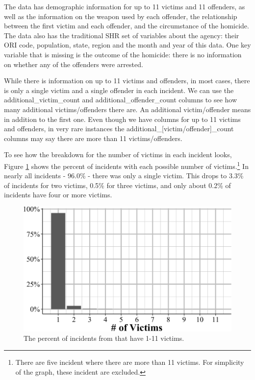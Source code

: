 \documentclass[
  12pt,
  openany]{book}
\begin{document}
The data has demographic information for up to 11 victims and 11 offenders, as well as the information on the weapon used by each offender, the relationship between the first victim and each offender, and the circumstance of the homicide. The data also has the traditional SHR set of variables about the agency: their ORI code, population, state, region and the month and year of this data. One key variable that is missing is the outcome of the homicide: there is no information on whether any of the offenders were arrested.

While there is information on up to 11 victims and offenders, in most cases, there is only a single victim and a single offender in each incident. We can use the additional\_victim\_count and additional\_offender\_count columns to see how many additional victims/offenders there are. An additional victim/offender means in addition to the first one. Even though we have columns for up to 11 victims and offenders, in very rare instances the additional\_{[}victim/offender{]}\_count columns may say there are more than 11 victims/offenders.

To see how the breakdown for the number of victims in each incident looks, Figure \ref{fig:numberSHRVictims} shows the percent of incidents with each possible number of victims.\footnote{There are five incident where there are more than 11 victims. For simplicity of the graph, these incident are excluded.} In nearly all incidents - 96.0\% - there was only a single victim. This drops to 3.3\% of incidents for two victims, 0.5\% for three victims, and only about 0.2\% of incidents have four or more victims.

\begin{figure}

{\centering \includegraphics[width=0.9\linewidth]{06_shr_files/figure-latex/numberSHRVictims-1} 

}

\caption{The percent of incidents from  that have 1-11 victims.}\label{fig:numberSHRVictims}
\end{figure}
\end{document}
